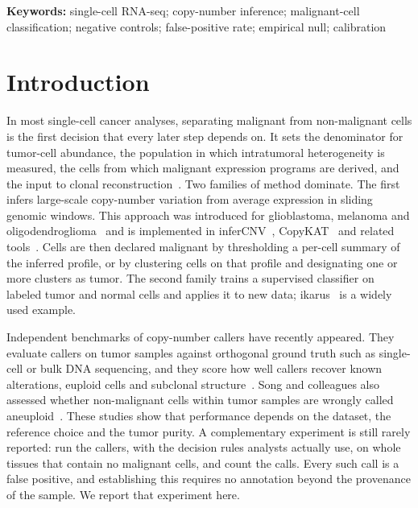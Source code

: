 \documentclass[11pt,letterpaper]{article}
\begin{document}
\vspace{0.6em}
\noindent\textbf{Keywords:} single-cell RNA-seq; copy-number inference; malignant-cell classification; negative controls; false-positive rate; empirical null; calibration
\par\endgroup

\vspace{0.8em}

\section{Introduction}

In most single-cell cancer analyses, separating malignant from non-malignant cells is the first decision that every later step depends on. It sets the denominator for tumor-cell abundance, the population in which intratumoral heterogeneity is measured, the cells from which malignant expression programs are derived, and the input to clonal reconstruction~\cite{andreatta2025}. Two families of method dominate. The first infers large-scale copy-number variation from average expression in sliding genomic windows. This approach was introduced for glioblastoma, melanoma and oligodendroglioma~\cite{patel2014,tirosh2016,tirosh2016b} and is implemented in inferCNV~\cite{infercnv}, CopyKAT~\cite{copykat} and related tools~\cite{conics,casper,honeybadger,numbat,scevan}. Cells are then declared malignant by thresholding a per-cell summary of the inferred profile, or by clustering cells on that profile and designating one or more clusters as tumor. The second family trains a supervised classifier on labeled tumor and normal cells and applies it to new data; ikarus~\cite{ikarus} is a widely used example.

Independent benchmarks of copy-number callers have recently appeared. They evaluate callers on tumor samples against orthogonal ground truth such as single-cell or bulk DNA sequencing, and they score how well callers recover known alterations, euploid cells and subclonal structure~\cite{schmid2025,song2025}. Song and colleagues also assessed whether non-malignant cells within tumor samples are wrongly called aneuploid~\cite{song2025}. These studies show that performance depends on the dataset, the reference choice and the tumor purity. A complementary experiment is still rarely reported: run the callers, with the decision rules analysts actually use, on whole tissues that contain no malignant cells, and count the calls. Every such call is a false positive, and establishing this requires no annotation beyond the provenance of the sample. We report that experiment here.
\end{document}
